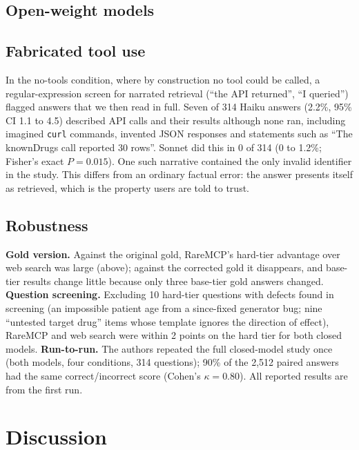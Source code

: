\documentclass[11pt]{article}
\begin{document}
\subsection{Open-weight models}
\label{sec:open}



\subsection{Fabricated tool use}
\label{sec:fab}

In the no-tools condition, where by construction no tool could be called, a regular-expression screen for narrated retrieval (``the API returned'', ``I queried'') flagged answers that we then read in full. Seven of 314 Haiku answers (2.2\%, 95\% CI 1.1 to 4.5) described API calls and their results although none ran, including imagined \texttt{curl} commands, invented JSON responses and statements such as ``The knownDrugs call reported 30 rows''. Sonnet did this in 0 of 314 (0 to 1.2\%; Fisher's exact $P=0.015$). One such narrative contained the only invalid identifier in the study. This differs from an ordinary factual error: the answer presents itself as retrieved, which is the property users are told to trust.

\subsection{Robustness}

\textbf{Gold version.} Against the original gold, RareMCP's hard-tier advantage over web search was large (above); against the corrected gold it disappears, and base-tier results change little because only three base-tier gold answers changed. \textbf{Question screening.} Excluding 10 hard-tier questions with defects found in screening (an impossible patient age from a since-fixed generator bug; nine ``untested target drug'' items whose template ignores the direction of effect), RareMCP and web search were within 2 points on the hard tier for both closed models. \textbf{Run-to-run.} The authors repeated the full closed-model study once (both models, four conditions, 314 questions); 90\% of the 2,512 paired answers had the same correct/incorrect score (Cohen's $\kappa=0.80$). All reported results are from the first run.

\section{Discussion}
\end{document}

